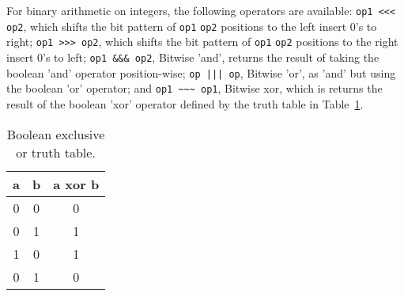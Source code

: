     

For binary arithmetic on integers, the following operators are available:
\lstinline{op1 <<< op2}, which shifts the bit pattern of \lstinline|op1| \lstinline|op2| positions to the left insert 0's to right;
\lstinline{op1 >>> op2}, which shifts the bit pattern of \lstinline|op1| \lstinline|op2| positions to the right insert 0's to left;
\lstinline{op1 &&& op2}, Bitwise 'and', returns the result of taking the boolean 'and' operator position-wise;
\lstinline{op ||| op}, Bitwise 'or', as 'and' but using the boolean 'or' operator; and
\lstinline{op1 ~~~ op1}, Bitwise xor, which is returns the result of the boolean 'xor' operator defined by the truth table in Table~\ref{tab:xor}.
\begin{table}
  \centering
  \begin{tabular}{|c|c|c|}
    \hline
    a&b& a xor b\\
    \hline
    0 & 0 & 0\\
    0 & 1 & 1\\
    1 & 0 & 1\\
    0 & 1 & 0\\
    \hline
  \end{tabular}
  \caption{Boolean exclusive or truth table.}
  \label{tab:xor}
\end{table}
%

